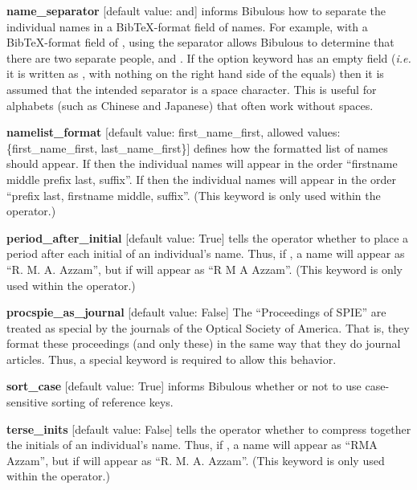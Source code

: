 \documentclass[letterpaper,10pt,english]{sphinxmanual}
\begin{document}
\textbf{name\_separator} {[}default value: and{]} informs Bibulous how to separate the individual names in a BibTeX-format field of names. For example, with a BibTeX-format field of , using the separator  allows Bibulous to determine that there are two separate people,  and . If the option keyword has an empty field (\emph{i.e.} it is written as , with nothing on the right hand side of the equals) then it is assumed that the intended separator is a space character. This is useful for alphabets (such as Chinese and Japanese) that often work without spaces.

\textbf{namelist\_format} {[}default value: first\_name\_first, allowed values: \{first\_name\_first, last\_name\_first\}{]} defines how the formatted list of names should appear. If  then the individual names will appear in the order ``firstname middle prefix last, suffix''. If  then the individual names will appear in the order ``prefix last, firstname middle, suffix''. (This keyword is only used within the  operator.)

\textbf{period\_after\_initial} {[}default value: True{]} tells the  operator whether to place a period after each initial of an individual's name. Thus, if , a name will appear as ``R. M. A. Azzam'', but if  will appear as ``R M A Azzam''. (This keyword is only used within the  operator.)

\textbf{procspie\_as\_journal} {[}default value: False{]} The ``Proceedings of SPIE'' are treated as special by the journals of the Optical Society of America. That is, they format these proceedings (and only these) in the same way that they do journal articles. Thus, a special keyword is required to allow this behavior.

\textbf{sort\_case} {[}default value: True{]} informs Bibulous whether or not to use case-sensitive sorting of reference keys.

\textbf{terse\_inits} {[}default value: False{]} tells the  operator whether to compress together the initials of an individual's name. Thus, if , a name will appear as ``RMA Azzam'', but if  will appear as ``R. M. A. Azzam''. (This keyword is only used within the  operator.)
\end{document}
